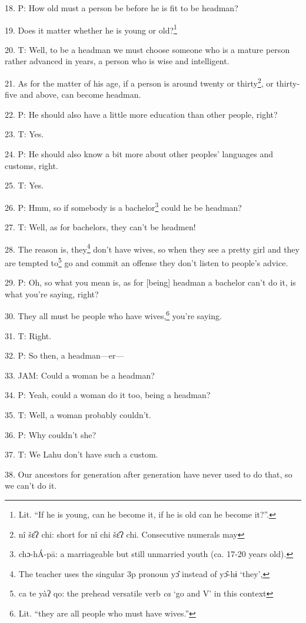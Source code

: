 18. P: How old must a person be before he is fit to be headman?

19. Does it matter whether he is young or old?\footnote{Lit. ``If he is young, can he become it, if he is old can he become it?''.}

20. T: Well, to be a headman we must choose someone who is a mature person rather
advanced in years, a person who is wise and intelligent.

21. As for the matter of his age, if a person is around twenty or thirty\footnote{nî šɛ̂ʔ chi: short for nî chi šɛ̂ʔ chi. Consecutive numerals may}, or
thirty-five and above, can become headman.

22. P: He should also have a little more education than other people, right?

23. T: Yes.

24. P: He should also know a bit more about other peoples' languages and customs,
right.

25. T: Yes.

26. P: Hmm, so if somebody is a bachelor\footnote{chɔ-hÁ-pā: a marriageable but still unmarried youth (ca. 17-20 years old).} could he be headman?

27. T: Well, as for bachelors, they can't be headmen!

28. The reason is, they\footnote{The teacher uses the singular 3p pronoun yɔ̂ instead of yɔ̂-hɨ `they',} don't have wives, so when they see a pretty girl and
they are tempted to\footnote{ca te yàʔ qo: the prehead versatile verb \textit{ca} `go and V' in this context} go and commit an offense they don't listen to people's advice.

29. P: Oh, so what you mean is, as for [being] headman a bachelor can't do it,
is what you're saying, right?

30. They all must be people who have wives,\footnote{Lit. ``they are all people who must have wives.''} you're saying.

31. T: Right.

32. P: So then, a headman---er---

33. JAM: Could a woman be a headman?

34. P: Yeah, could a woman do it too, being a headman?

35. T: Well, a woman probably couldn't.

36. P: Why couldn't she?

37. T: We Lahu don't have such a custom.

38. Our ancestors for generation after generation have never used to do that, so
we can't do it.

